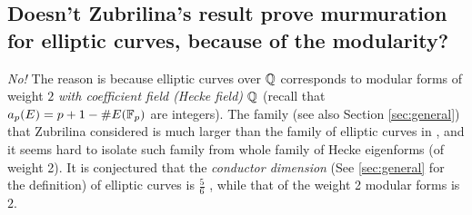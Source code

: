 \subsection{Doesn't Zubrilina's result prove murmuration for elliptic curves, because of the modularity?}

\emph{No!}
The reason is because elliptic curves over $\mathbb{Q}$ corresponds to modular forms of weight $2$ \emph{with coefficient field (Hecke field) $\mathbb{Q}$} (recall that $a_p(E) = p + 1 - \#E(\mathbb{F}_p)$ are integers).
The family (see also Section \ref{sec:general}) that Zubrilina considered is much larger than the family of elliptic curves in \cite{he2024murmurations}, and it seems hard to isolate such family from whole family of Hecke eigenforms (of weight 2).
It is conjectured that the \emph{conductor dimension} (See \ref{sec:general} for the definition) of elliptic curves is $\frac{5}{6}$ \cite{shankar2019families}, while that of the weight 2 modular forms is $2$.